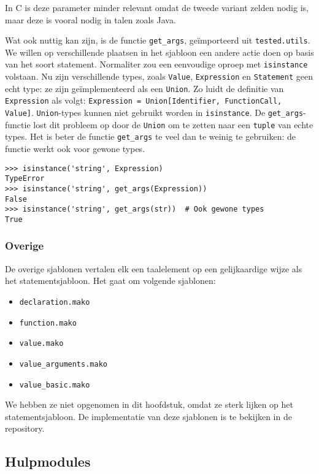 In C is deze parameter minder relevant omdat de tweede variant zelden nodig is, maar deze is vooral nodig in talen zoals Java.

Wat ook nuttig kan zijn, is de functie \texttt{get\_args}, geïmporteerd uit \texttt{tested.utils}.
We willen op verschillende plaatsen in het sjabloon een andere actie doen op basis van het soort statement.
Normaliter zou een eenvoudige oproep met \texttt{isinstance} volstaan.
Nu zijn verschillende types, zoals \texttt{Value}, \texttt{Expression} en \texttt{Statement} geen echt type: ze zijn geïmplementeerd als een \texttt{Union}.
Zo luidt de definitie van \texttt{Expression} als volgt: \texttt{Expression = Union[Identifier, FunctionCall, Value]}.
\texttt{Union}-types kunnen niet gebruikt worden in \texttt{isinstance}.
De \texttt{get\_args}-functie lost dit probleem op door de \texttt{Union} om te zetten naar een \texttt{tuple} van echte types.
Het is beter de functie \texttt{get\_args} te veel dan te weinig te gebruiken: de functie werkt ook voor gewone types.

\begin{verbatim}
>>> isinstance('string', Expression)
TypeError
>>> isinstance('string', get_args(Expression))
False
>>> isinstance('string', get_args(str))  # Ook gewone types
True
\end{verbatim}

\subsubsection{Overige}

De overige sjablonen vertalen elk een taalelement op een gelijkaardige wijze als het statementsjabloon.
Het gaat om volgende sjablonen:

\begin{itemize}
    \item \texttt{declaration.mako}
    \item \texttt{function.mako}
    \item \texttt{value.mako}
    \item \texttt{value\_arguments.mako}
    \item \texttt{value\_basic.mako}
\end{itemize}

We hebben ze niet opgenomen in dit hoofdstuk, omdat ze sterk lijken op het statementsjabloon.
De implementatie van deze sjablonen is te bekijken in de repository.

\subsection{Hulpmodules}\label{subsec:hulpmodules}

